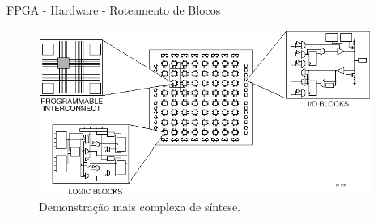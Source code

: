 \documentclass[aspectratio=169]{beamer}
\begin{document}
	\begin{frame}{FPGA - Hardware - Roteamento de Blocos}
		\begin{figure}[H]
			\centering
			\includegraphics[width=0.97\textwidth]{img/fpga/demonstracao_2.png}
			\caption{Demonstração mais complexa de síntese.}
		\end{figure}
	\end{frame}
	
\end{document}

